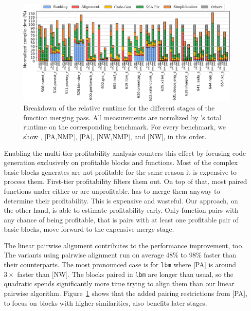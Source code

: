 \begin{figure}[h]
  \centering
  \includegraphics[width=\linewidth]{src/lctes21/figs/breakdown-full-spec17.pdf}
  \caption{Breakdown of the relative runtime for the different stages of the function merging pass. All measurements are normlized by \SOAName's total runtime on the corresponding benchmark. For every benchmark, we show {\SOAName}, [PA,NMP], [PA], [NW,NMP], and [NW], in this order. }
  \label{fig:breakdown-spec17}
\end{figure}

Enabling the multi-tier profitability analysis counters this effect by focusing code generation exclusively on profitable blocks and functions. Most of the complex basic blocks {\ProjName} generates are not profitable for the same reason it is expensive to process them. First-tier profitability filters them out. On top of that, most paired functions under either {\SOAName} or {\ProjName} are unprofitable. {\SOAName} has to merge them anyway to determine their profitability. This is expensive and wasteful. Our approach, on the other hand, is able to estimate profitability early. Only function pairs with any chance of being profitable, that is pairs with at least one profitable pair of basic blocks, move forward to the expensive merge stage.

The linear pairwise alignment contributes to the performance improvement, too. The variants using pairwise alignment run on average 48\% to 98\% faster than their {\NW} counterparts.
The most pronounced case is for \texttt{lbm} where {[PA]} is around $3\times$ faster than {[NW]}. The blocks paired in \texttt{lbm} are longer than usual, so the quadratic {\NW} spends significantly more time trying to align them than our linear pairwise algorithm.
Figure~\ref{fig:breakdown-spec17} shows that the added pairing restrictions from [PA], to focus on blocks with higher similarities, also benefits later stages.

